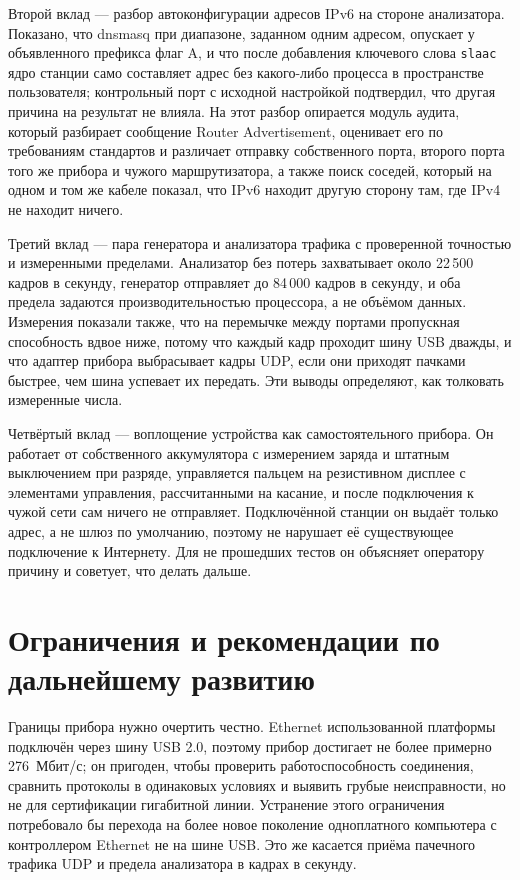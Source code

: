 Второй вклад — разбор автоконфигурации адресов IPv6 на стороне анализатора. Показано, что dnsmasq при диапазоне, заданном одним адресом, опускает у объявленного префикса флаг A, и что после добавления ключевого слова \texttt{slaac} ядро станции само составляет адрес без какого-либо процесса в пространстве пользователя; контрольный порт с исходной настройкой подтвердил, что другая причина на результат не влияла. На этот разбор опирается модуль аудита, который разбирает сообщение Router Advertisement, оценивает его по требованиям стандартов и различает отправку собственного порта, второго порта того же прибора и чужого маршрутизатора, а также поиск соседей, который на одном и том же кабеле показал, что IPv6 находит другую сторону там, где IPv4 не находит ничего.

Третий вклад — пара генератора и анализатора трафика с проверенной точностью и измеренными пределами. Анализатор без потерь захватывает около 22\,500 кадров в секунду, генератор отправляет до 84\,000 кадров в секунду, и оба предела задаются производительностью процессора, а не объёмом данных. Измерения показали также, что на перемычке между портами пропускная способность вдвое ниже, потому что каждый кадр проходит шину USB дважды, и что адаптер прибора выбрасывает кадры UDP, если они приходят пачками быстрее, чем шина успевает их передать. Эти выводы определяют, как толковать измеренные числа.

Четвёртый вклад — воплощение устройства как самостоятельного прибора. Он работает от собственного аккумулятора с измерением заряда и штатным выключением при разряде, управляется пальцем на резистивном дисплее с элементами управления, рассчитанными на касание, и после подключения к чужой сети сам ничего не отправляет. Подключённой станции он выдаёт только адрес, а не шлюз по умолчанию, поэтому не нарушает её существующее подключение к Интернету. Для не прошедших тестов он объясняет оператору причину и советует, что делать дальше.

\section*{Ограничения и рекомендации по дальнейшему развитию}

Границы прибора нужно очертить честно. Ethernet использованной платформы подключён через шину USB 2.0, поэтому прибор достигает не более примерно 276~Мбит/с; он пригоден, чтобы проверить работоспособность соединения, сравнить протоколы в одинаковых условиях и выявить грубые неисправности, но не для сертификации гигабитной линии. Устранение этого ограничения потребовало бы перехода на более новое поколение одноплатного компьютера с контроллером Ethernet не на шине USB. Это же касается приёма пачечного трафика UDP и предела анализатора в кадрах в секунду.

